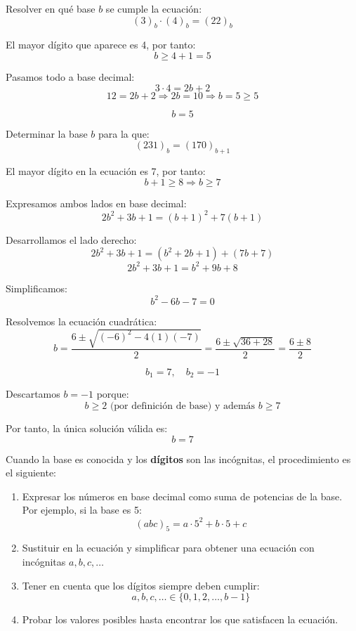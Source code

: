 \documentclass[a4paper,12pt]{article}
\begin{document}
\begin{ejemplo}[title={Ejemplo 1: Encontrar la base}]
Resolver en qué base \( b \) se cumple la ecuación:
\[
(3)_b \cdot (4)_b = (22)_b
\]

El mayor dígito que aparece es 4, por tanto:
\[
b \geq 4 + 1 = 5
\]

Pasamos todo a base decimal:
\[
3 \cdot 4 = 2b + 2
\]
\[
12 = 2b + 2 \Rightarrow 2b = 10 \Rightarrow b = 5 \ge 5
\]

\[
\boxed{b = 5}
\]
\end{ejemplo}

\begin{ejemplo}[title={Ejemplo 2: Encontrar la base}]
Determinar la base \( b \) para la que:
\[
(231)_b = (170)_{b+1}
\]

El mayor dígito en la ecuación es 7, por tanto:
\[
b + 1 \geq 8 \Rightarrow b \geq 7
\]

Expresamos ambos lados en base decimal:
\[
2b^2 + 3b + 1 = (b+1)^2 + 7(b+1)
\]

Desarrollamos el lado derecho:
\[
2b^2 + 3b + 1 = (b^2 + 2b + 1) + (7b + 7)
\]
\[
2b^2 + 3b + 1 = b^2 + 9b + 8
\]

Simplificamos:
\[
b^2 - 6b - 7 = 0
\]

Resolvemos la ecuación cuadrática:
\[
b = \frac{6 \pm \sqrt{(-6)^2 - 4(1)(-7)}}{2} = \frac{6 \pm \sqrt{36 + 28}}{2} = \frac{6 \pm 8}{2}
\]

\[
b_1 = 7, \quad b_2 = -1
\]

Descartamos \( b = -1 \) porque:
\[
b \geq 2 \text{ (por definición de base) y además } b \geq 7
\]

Por tanto, la única solución válida es:
\[
\boxed{b = 7}
\]
\end{ejemplo}


\begin{procedimiento}[title=Encontrar los números o dígitos]
Cuando la base es conocida y los \textbf{dígitos} son las incógnitas, el procedimiento es el siguiente:

\begin{enumerate}
    \item Expresar los números en base decimal como suma de potencias de la base.  
    Por ejemplo, si la base es 5:
    \[
    (abc)_5 = a\cdot5^2 + b\cdot5 + c
    \]
    \item Sustituir en la ecuación y simplificar para obtener una ecuación con incógnitas \( a, b, c, \ldots \)
    \item Tener en cuenta que los dígitos siempre deben cumplir:
    \[
    a, b, c, \ldots \in \{0,1,2,\ldots,b-1\}
    \]
    \item Probar los valores posibles hasta encontrar los que satisfacen la ecuación.
\end{enumerate}
\end{procedimiento}
\end{document}
